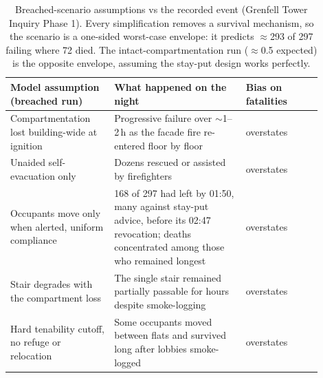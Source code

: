 \begin{table}[htbp]
  \centering
  \caption{Breached-scenario assumptions vs the recorded event (Grenfell Tower
  Inquiry Phase 1). Every simplification removes a survival mechanism, so the
  scenario is a one-sided worst-case envelope: it predicts $\approx$293 of 297
  failing where 72 died. The intact-compartmentation run ($\approx$0.5 expected)
  is the opposite envelope, assuming the stay-put design works perfectly.}
  \label{tab:grenfell-assumptions}
  \small
  \begin{tabular}{p{0.30\linewidth}p{0.38\linewidth}p{0.22\linewidth}}
    \hline
    Model assumption (breached run) & What happened on the night & Bias on fatalities \\
    \hline
    Compartmentation lost building-wide at ignition &
    Progressive failure over $\sim$1--2\,h as the facade fire re-entered floor by
    floor & overstates \\
    Unaided self-evacuation only &
    Dozens rescued or assisted by firefighters & overstates \\
    Occupants move only when alerted, uniform compliance &
    168 of 297 had left by 01:50, many against stay-put advice, before its 02:47
    revocation; deaths concentrated among those who remained longest & overstates \\
    Stair degrades with the compartment loss &
    The single stair remained partially passable for hours despite smoke-logging &
    overstates \\
    Hard tenability cutoff, no refuge or relocation &
    Some occupants moved between flats and survived long after lobbies
    smoke-logged & overstates \\
    \hline
  \end{tabular}
\end{table}

